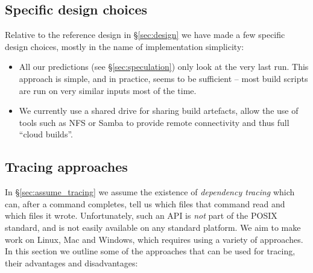 \subsection{Specific design choices}

Relative to the reference design in \S\ref{sec:design} we have made a few specific design choices, mostly in the name of implementation simplicity:

\begin{itemize}
\item All our predictions (see \S\ref{sec:speculation}) only look at the very last run. This approach is simple, and in practice, seems to be sufficient -- most build scripts are run on very similar inputs most of the time.
\item We currently use a shared drive for sharing build artefacts, allow the use of tools such as NFS or Samba to provide remote connectivity and thus full ``cloud builds''.
\end{itemize}


\subsection{Tracing approaches}
\label{sec:tracing}

In \S\ref{sec:assume_tracing} we assume the existence of \emph{dependency tracing} which can, after a command completes, tell us which files that command read and which files it wrote. Unfortunately, such an API is \emph{not} part of the POSIX standard, and is not easily available on any standard platform. We aim to make \Rattle work on Linux, Mac and Windows, which requires using a variety of approaches. In this section we outline some of the approaches that can be used for tracing, their advantages and disadvantages:

